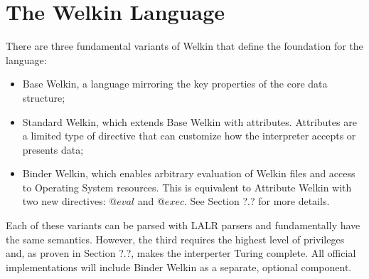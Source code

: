 \section{The Welkin Language}

There are three fundamental variants of Welkin that define the foundation for the language:
\begin{itemize}
	\item Base Welkin, a language mirroring the key properties of the core data structure;
	\item Standard Welkin, which extends Base Welkin with attributes. Attributes are a limited type of directive that can customize how the interpreter accepts or presents data;
	\item Binder Welkin, which enables arbitrary evaluation of Welkin files and access to Operating System resources. This is equivalent to Attribute Welkin with two new directives: $@eval$ and $@exec.$ See Section ?.? for more details.
\end{itemize}
Each of these variants can be parsed with LALR parsers and fundamentally have the same semantics. However, the third requires the highest level of privileges and, as proven in Section ?.?, makes the interperter Turing complete. All official implementations will include Binder Welkin as a separate, optional component.
